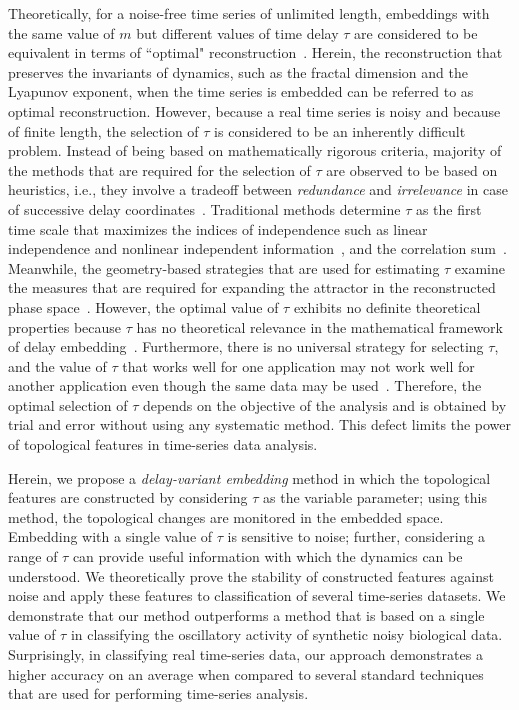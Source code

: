 \documentclass[twocolumn,pre,amsmath,amssymb]{revtex4-1}
\begin{document}
Theoretically, for a noise-free time series of unlimited length,
embeddings with the same value of $m$ but different values of time delay $\tau$ are 
considered to be equivalent in terms of ``optimal" reconstruction~\cite{taken:1981}.
Herein, the reconstruction that preserves the invariants of dynamics, 
such as the fractal dimension and the Lyapunov exponent,
when the time series is embedded can be referred to as optimal reconstruction.
However, because a real time series is noisy and because of finite length,
the selection of $\tau$ is considered to be an inherently difficult problem.
Instead of being based on mathematically rigorous criteria, 
majority of the methods that are required for the selection of $\tau$
are observed to be based on heuristics, i.e.,
they involve a tradeoff between \textit{redundance} and \textit{irrelevance} 
in case of successive delay coordinates~\cite{casdagli:state:1991}.
Traditional methods determine $\tau$ as the first time scale
that maximizes the indices of independence 
such as linear independence and nonlinear independent information~\cite{fraser:pra:1986}, 
and the correlation sum~\cite{liebert:proper:1989}.
Meanwhile, the geometry-based strategies that are used for estimating $\tau$ 
examine the measures that are required for expanding 
the attractor in the reconstructed phase space~\cite{buzug:optimal:1992,buzug:comp:1992,rosenstein:recons:1994}.
However, the optimal value of $\tau$ exhibits no definite theoretical properties
because $\tau$ has no theoretical relevance in the mathematical framework of delay embedding~\cite{kantz:nonlinear:2003}.
Furthermore, there is no universal strategy for selecting $\tau$, 
and the value of $\tau$ that works well for one application 
may not work well for another application
even though the same data may be used~\cite{bradley:nonlinear:2015}.
Therefore, the optimal selection of $\tau$ depends on the objective of the analysis 
and is obtained by trial and error without using any systematic method.
This defect limits the power of 
topological features in time-series data analysis.

Herein, we propose a \emph{delay-variant embedding} method
in which the topological features are constructed
by considering $\tau$ as the variable parameter;
using this method, the topological changes are monitored in the embedded space.
Embedding with a single value of $\tau$ is sensitive to noise;
further, considering a range of $\tau$ can provide useful information
with which the dynamics can be understood.
We theoretically prove the stability of constructed features against noise and apply these features to classification of several time-series datasets. 
We demonstrate that our method outperforms a method that is based on a single value of $\tau$ 
in classifying the oscillatory activity of synthetic noisy biological data.
Surprisingly, in classifying real time-series data, 
our approach demonstrates a higher accuracy on an average
when compared to several standard techniques
that are used for performing time-series analysis.
\end{document}
